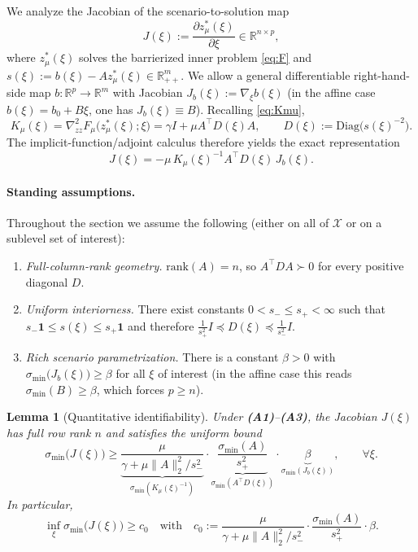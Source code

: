 \documentclass[11pt]{article}
\newtheorem{lemma}{Lemma}
\theoremstyle{remark}
\begin{document}
We analyze the Jacobian of the scenario-to-solution map
\begin{equation}
\label{eq:J_def}
J(\xi):=\frac{\partial z_\mu^*(\xi)}{\partial \xi}\in\mathbb R^{n\times p},
\end{equation}
where $z_\mu^*(\xi)$ solves the barrierized inner problem \eqref{eq:F} and $s(\xi):=b(\xi)-A z_\mu^*(\xi)\in\mathbb R_{++}^m$. We allow a general differentiable right-hand-side map $b:\mathbb R^p\to\mathbb R^m$ with Jacobian $J_b(\xi):=\nabla_\xi b(\xi)$ (in the affine case $b(\xi)=b_0+B\xi$, one has $J_b(\xi)\equiv B$). Recalling \eqref{eq:Kmu},
\begin{equation*}
K_\mu(\xi)=\nabla_{zz}^2F_\mu\big(z_\mu^*(\xi);\xi\big)=\gamma I+\mu A^\top D(\xi)A,\qquad D(\xi):=\mathrm{Diag}\big(s(\xi)^{-2}\big).
\end{equation*}
The implicit-function/adjoint calculus therefore yields the exact representation
\begin{equation}
\label{eq:J_formula}
J(\xi)=-\mu\,K_\mu(\xi)^{-1}A^\top D(\xi)\,J_b(\xi).
\end{equation}

\paragraph{Standing assumptions.}
Throughout the section we assume the following (either on all of $\mathcal X$ or on a sublevel set of interest):
\begin{enumerate}[leftmargin=2em,label=\textbf{(A\arabic*)}]
\item \emph{Full-column-rank geometry.} $\mathrm{rank}(A)=n$, so $A^\top D A\succ0$ for every positive diagonal $D$.
\item \emph{Uniform interiorness.} There exist constants $0<s_-\le s_+<\infty$ such that $s_-\mathbf 1\le s(\xi)\le s_+\mathbf 1$ and therefore $\frac{1}{s_+^2}I\preceq D(\xi)\preceq \frac{1}{s_-^2}I$.
\item \emph{Rich scenario parametrization.} There is a constant $\beta>0$ with $\sigma_{\min}\big(J_b(\xi)\big)\ge\beta$ for all $\xi$ of interest (in the affine case this reads $\sigma_{\min}(B)\ge\beta$, which forces $p\ge n$).
\end{enumerate}

\begin{lemma}[Quantitative identifiability]
\label{lem:smin_lower_bound}
Under \textbf{(A1)}–\textbf{(A3)}, the Jacobian $J(\xi)$ has full row rank $n$ and satisfies the uniform bound
\begin{equation}
\label{eq:smin_bound}
\sigma_{\min}\big(J(\xi)\big)\ge 
\underbrace{\frac{\mu}{\gamma+\mu\|A\|_2^2/s_-^{2}}}_{\sigma_{\min}(K_\mu(\xi)^{-1})}
\cdot 
\underbrace{\frac{\sigma_{\min}(A)}{s_+^{2}}}_{\sigma_{\min}(A^\top D(\xi))}
\cdot 
\underbrace{\beta}_{\sigma_{\min}(J_b(\xi))},
\qquad \forall\xi.
\end{equation}
In particular,
\begin{equation*}
\inf_\xi \sigma_{\min}\big(J(\xi)\big)\ge c_0\quad\text{with}\quad c_0:=\frac{\mu}{\gamma+\mu\|A\|_2^2/s_-^{2}}\cdot\frac{\sigma_{\min}(A)}{s_+^{2}}\cdot\beta.
\end{equation*}
\end{lemma}
\end{document}
